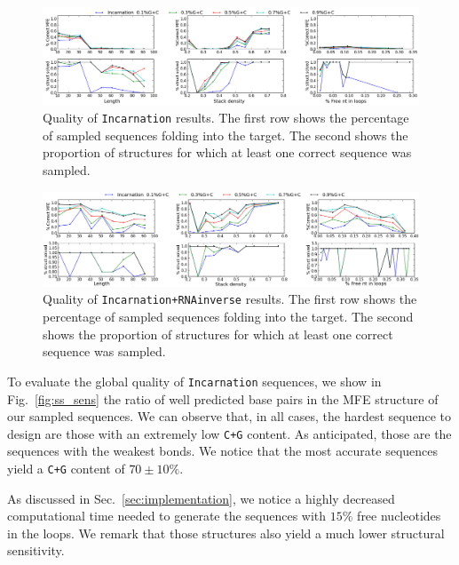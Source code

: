 \begin{figure}[ht!]	
	\centering
	\includegraphics[width=\textwidth]{Figures/mfe_struct_solve_nornainverse.png}
	\caption{Quality of \texttt{Incarnation} results. The first row shows the percentage
	of sampled sequences folding into the target. The second shows the 	
	proportion	of structures for which at least one correct sequence was 
	sampled.}
	\label{fig:mfe_struct_solved_noinverse}	
\end{figure}



\begin{figure}[ht!]	
	\centering
	\includegraphics[width=\textwidth]{Figures/mfe_struct_solved}
	\caption{Quality of \texttt{Incarnation+RNAinverse} results. The first row shows the percentage
	of sampled sequences folding into the target. The second shows the 	
	proportion	of structures for which at least one correct sequence was 
	sampled.}
	\label{fig:mfe_struct_solved}	
\end{figure}
 
To evaluate the global quality of \texttt{Incarnation} sequences, we show
in Fig.~\ref{fig:ss_sens} the ratio of well predicted base pairs in the
MFE structure of our sampled sequences. We can observe that, in all cases,
the hardest sequence to design are those with an extremely low \texttt{C+G}
content. As anticipated, those are the sequences with the weakest bonds.
We notice that the most accurate sequences yield a \texttt{C+G} content
of $70\pm 10\%$. 

As discussed in Sec.~\ref{sec:implementation}, we notice a highly decreased
computational time needed to generate the sequences with $15\%$ free 
nucleotides in the loops. We remark that those structures also yield 
a much lower structural sensitivity.

